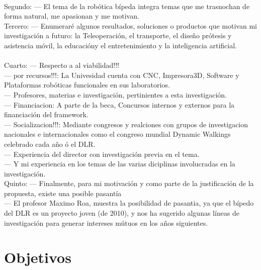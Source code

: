 \documentclass[10pt,letterpaper,oneside,onecolumn]{article}
\newcommand{\nnext}{\quad[\quad$\unrhd$\quad]}
\newcommand{\anext}{\quad[\quad$\rhd$\quad]}
\begin{document}
{\\
  Segundo: --- El tema de la rob\'otica b\'ipeda integra temas que me trasnochan de forma natural, me apasionan y me motivan.\anext{}\\
  Tercero: --- Enumerar\'e algunos resultados, soluciones o productos que motivan mi investigaci\'on a futuro: la Teleoperaci\'on\anext, el transporte\anext, el dise\~no pr\'otesis y asistencia m\'ovil\anext{}, la educaci\'on\anext y el entretenimiento y la inteligencia artificial.\anext\\
\\
  Cuarto: --- Respecto a al viabilidad!!!\anext\\
  --- por recursos!!!: La Univesidad cuenta con CNC, Impresora3D, Software y Plataformas rob\'oticas funcionales en sus laboratorios.\anext\\
  --- Profesores, materias e investigaci\'on, pertinientes a esta investigaci\'on.\anext\\
  --- Financiacion: A parte de la beca, Concursos internos y externos para la financiaci\'on del framework.\anext\\
  --- Socializacion!!!: Mediante congresos y realciones con grupos de investigacion nacionales e internacionales como el congreso mundial Dynamic Walkings celebrado cada a\~no \'o el DLR.\anext\\
  --- Experiencia del director con investigaci\'on previa en el tema.\anext\\
  --- Y mi experiencia en los temas de las varias diciplinas involucradas en la investigaci\'on.\nnext\\
  Quinto: --- Finalmente, para mi motivaci\'on  y como parte de la justificaci\'on de la propuesta, existe una posible pasant\'ia\\
  --- El profesor Maximo Roa, muestra la posibilidad de pasantia, ya que el b\'ipedo del DLR es un proyecto joven (de 2010), y nos ha sugerido algunas l\'ineas de investigaci\'on para generar intereses m\'utuos en los a\~nos siguientes.\\

  \section{Objetivos}
  \label{sec:objetivos}

}
\end{document}
